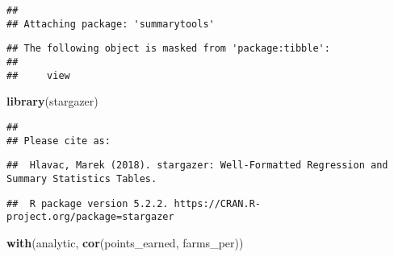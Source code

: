 \documentclass[
]{article}
\newenvironment{Shaded}{\begin{snugshade}}{\end{snugshade}}
\newcommand{\CommentTok}[1]{\textcolor[rgb]{0.56,0.35,0.01}{\textit{#1}}}
\newcommand{\ControlFlowTok}[1]{\textcolor[rgb]{0.13,0.29,0.53}{\textbf{#1}}}
\newcommand{\DataTypeTok}[1]{\textcolor[rgb]{0.13,0.29,0.53}{#1}}
\newcommand{\KeywordTok}[1]{\textcolor[rgb]{0.13,0.29,0.53}{\textbf{#1}}}
\newcommand{\NormalTok}[1]{#1}
\newcommand{\OperatorTok}[1]{\textcolor[rgb]{0.81,0.36,0.00}{\textbf{#1}}}
\newcommand{\StringTok}[1]{\textcolor[rgb]{0.31,0.60,0.02}{#1}}
\begin{document}
\begin{verbatim}
## 
## Attaching package: 'summarytools'
\end{verbatim}

\begin{verbatim}
## The following object is masked from 'package:tibble':
## 
##     view
\end{verbatim}

\begin{Shaded}
\begin{Highlighting}[]
\KeywordTok{library}\NormalTok{(stargazer)}
\end{Highlighting}
\end{Shaded}

\begin{verbatim}
## 
## Please cite as:
\end{verbatim}

\begin{verbatim}
##  Hlavac, Marek (2018). stargazer: Well-Formatted Regression and Summary Statistics Tables.
\end{verbatim}

\begin{verbatim}
##  R package version 5.2.2. https://CRAN.R-project.org/package=stargazer
\end{verbatim}

\begin{Shaded}
\end{Shaded}

\begin{Shaded}
\begin{Highlighting}[]
\KeywordTok{with}\NormalTok{(analytic, }\KeywordTok{cor}\NormalTok{(points_earned, farms_per))}
\end{Highlighting}
\end{Shaded}
\end{document}
